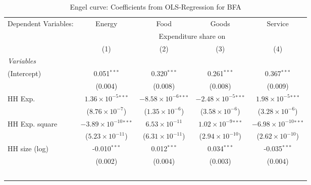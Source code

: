 
\begin{table}[htbp!]
   \centering
   \small
   \begin{adjustbox}{width = 1\textwidth, max height = 0.95\textheight, center}
      \begin{threeparttable}[b]
         \caption{\label{tab:Engel_parametric_BFA} Engel curve: Coefficients from OLS-Regression for BFA}
         \begin{tabular}{lcccc}
            \tabularnewline \midrule \midrule
            Dependent Variables: & Energy                          & Food                           & Goods                          & Service\\  
             & \multicolumn{4}{c}{Expenditure share on} \\ 
                                 & (1)                             & (2)                            & (3)                            & (4)\\  
            \midrule
            \emph{Variables}\\
            (Intercept)          & 0.051$^{***}$                   & 0.320$^{***}$                  & 0.261$^{***}$                  & 0.367$^{***}$\\   
                                 & (0.004)                         & (0.008)                        & (0.008)                        & (0.009)\\   
            HH Exp.              & $1.36\times 10^{-5}$$^{***}$    & $-8.58\times 10^{-6}$$^{***}$  & $-2.48\times 10^{-5}$$^{***}$  & $1.98\times 10^{-5}$$^{***}$\\    
                                 & ($8.76\times 10^{-7}$)          & ($1.35\times 10^{-6}$)         & ($3.58\times 10^{-6}$)         & ($3.28\times 10^{-6}$)\\    
            HH Exp. square       & $-3.89\times 10^{-10}$$^{***}$  & $6.53\times 10^{-11}$          & $1.02\times 10^{-9}$$^{***}$   & $-6.98\times 10^{-10}$$^{***}$\\    
                                 & ($5.23\times 10^{-11}$)         & ($6.31\times 10^{-11}$)        & ($2.94\times 10^{-10}$)        & ($2.62\times 10^{-10}$)\\    
            HH size (log)        & -0.010$^{***}$                  & 0.012$^{***}$                  & 0.034$^{***}$                  & -0.035$^{***}$\\   
                                 & (0.002)                         & (0.004)                        & (0.003)                        & (0.004)\\   
$$
\end{tabular}
\end{threeparttable}
\end{adjustbox}
\end{table}
